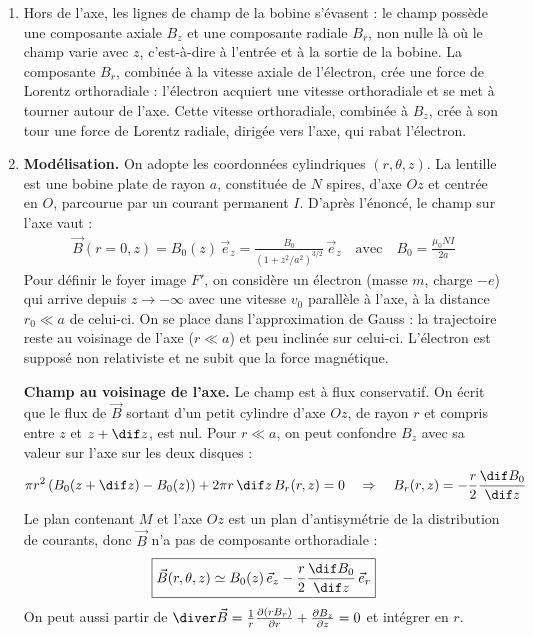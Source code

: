 \begin{correction}

\begin{enumerate}

	\item Hors de l'axe, les lignes de champ de la bobine s'évasent : le champ possède une composante axiale $B_z$ et une composante radiale $B_r$, non nulle là où le champ varie avec $z$, c'est-à-dire à l'entrée et à la sortie de la bobine. La composante $B_r$, combinée à la vitesse axiale de l'électron, crée une force de Lorentz orthoradiale : l'électron acquiert une vitesse orthoradiale et se met à tourner autour de l'axe. Cette vitesse orthoradiale, combinée à $B_z$, crée à son tour une force de Lorentz radiale, dirigée vers l'axe, qui rabat l'électron.

	\item \textbf{Modélisation.} On adopte les coordonnées cylindriques $(r,\theta,z)$. La lentille est une bobine plate de rayon $a$, constituée de $N$ spires, d'axe $Oz$ et centrée en $O$, parcourue par un courant permanent $I$. D'après l'énoncé, le champ sur l'axe vaut :
	\begin{align*}
		\vec{B}(r=0,z)=B_0(z)\,\vec{e}_z=\frac{B_0}{\left(1+z^2/a^2\right)^{3/2}}\,\vec{e}_z \quad\text{avec}\quad B_0=\frac{\mu_0NI}{2a}
	\end{align*}
	Pour définir le foyer image $F'$, on considère un électron (masse $m$, charge $-e$) qui arrive depuis $z\to-\infty$ avec une vitesse $v_0$ parallèle à l'axe, à la distance $r_0\ll a$ de celui-ci. On se place dans l'approximation de Gauss : la trajectoire reste au voisinage de l'axe ($r\ll a$) et peu inclinée sur celui-ci. L'électron est supposé non relativiste et ne subit que la force magnétique.

	\medskip
	\textbf{Champ au voisinage de l'axe.} Le champ est à flux conservatif. On écrit que le flux de $\vec{B}$ sortant d'un petit cylindre d'axe $Oz$, de rayon $r$ et compris entre $z$ et $z+\dif z$, est nul. Pour $r\ll a$, on peut confondre $B_z$ avec sa valeur sur l'axe sur les deux disques :
	\begin{align*}
		\pi r^2\left(B_0(z+\dif z)-B_0(z)\right)+2\pi r\,\dif z\,B_r(r,z)=0 \quad\Rightarrow\quad B_r(r,z)=-\frac{r}{2}\frac{\dif B_0}{\dif z}
	\end{align*}
	Le plan contenant $M$ et l'axe $Oz$ est un plan d'antisymétrie de la distribution de courants, donc $\vec{B}$ n'a pas de composante orthoradiale :
	\begin{align*}
		\boxed{\vec{B}(r,\theta,z)\simeq B_0(z)\,\vec{e}_z-\frac{r}{2}\frac{\dif B_0}{\dif z}\,\vec{e}_r}
	\end{align*}
	On peut aussi partir de $\diver\vec{B}=\frac{1}{r}\frac{\partial(rB_r)}{\partial r}+\frac{\partial B_z}{\partial z}=0$ et intégrer en $r$.



\end{enumerate}
\end{correction}
